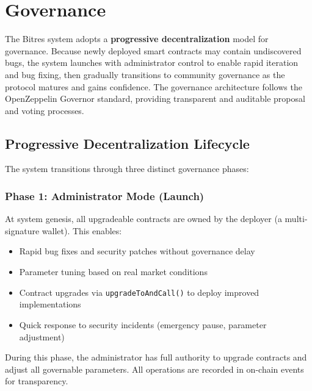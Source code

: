\documentclass{article}
\begin{document}
\section{Governance}

The Bitres system adopts a \textbf{progressive decentralization} model for governance. Because newly deployed smart contracts may contain undiscovered bugs, the system launches with administrator control to enable rapid iteration and bug fixing, then gradually transitions to community governance as the protocol matures and gains confidence. The governance architecture follows the OpenZeppelin Governor standard, providing transparent and auditable proposal and voting processes.

\subsection{Progressive Decentralization Lifecycle}

The system transitions through three distinct governance phases:

\subsubsection{Phase 1: Administrator Mode (Launch)}
At system genesis, all upgradeable contracts are owned by the deployer (a multi-signature wallet). This enables:
\begin{itemize}
  \item Rapid bug fixes and security patches without governance delay
  \item Parameter tuning based on real market conditions
  \item Contract upgrades via \texttt{upgradeToAndCall()} to deploy improved implementations
  \item Quick response to security incidents (emergency pause, parameter adjustment)
\end{itemize}
During this phase, the administrator has full authority to upgrade contracts and adjust all governable parameters. All operations are recorded in on-chain events for transparency.
\end{document}
